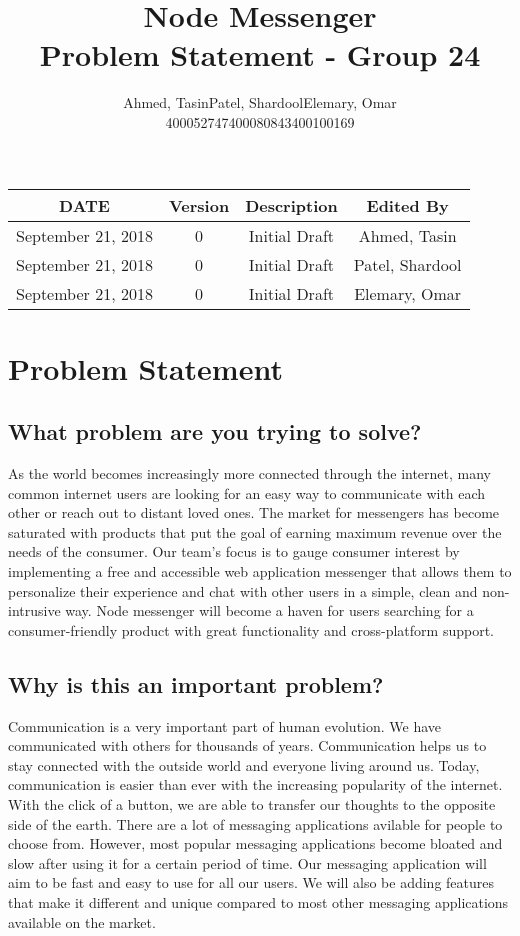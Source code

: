 \documentclass{article}
\title{\Huge\textbf{Node Messenger}\\
		\huge{Problem Statement - Group 24}}
\author{Ahmed, Tasin\hspace{1cm}Patel, Shardool\hspace{1cm}Elemary, Omar \\
		400052747\hspace{2cm}400080843\hspace{2cm}400100169}
\begin{document}
\maketitle
  	
\begin{table}[hp]
\begin{center}
\label{tab:}
\begin{tabular}{|c|c|c|c|}
\hline
\textbf{DATE} & \textbf{Version} & \textbf{Description} & \textbf{Edited By}\\
\hline
September 21, 2018 & 0 & Initial Draft & Ahmed, Tasin\\
\hline
September 21, 2018 & 0 & Initial Draft & Patel, Shardool\\
\hline
September 21, 2018 & 0 & Initial Draft & Elemary, Omar\\
\hline
\end{tabular}
\end{center}
\label{default}
\end{table}
	\newpage
	\newpage
	\section{Problem Statement}
	\subsection{What problem are you trying to solve?}
    As the world becomes increasingly more connected through the internet, many common internet users are looking for an easy way to communicate with each other or reach out to distant loved ones. The market for messengers has become saturated with products that put the goal of earning maximum revenue over the needs of the consumer. Our team’s focus is to gauge consumer interest by implementing a free and accessible web application messenger that allows them to personalize their experience and chat with other users in a simple, clean and non-intrusive way. Node messenger will become a haven for users searching for a consumer-friendly product with great functionality and cross-platform support.
	\subsection{Why is this an important problem?}
    Communication is a very important part of human evolution. We have communicated with others for thousands of years. Communication helps us to stay connected with the outside world and everyone living around us. Today, communication is easier than ever with the increasing popularity of the internet. With the click of a button, we are able to transfer our thoughts to the opposite side of the earth. There are a lot of messaging applications avilable for people to choose from. However, most popular messaging applications become bloated and slow after using it for a certain period of time. Our messaging application will aim to be fast and easy to use for all our users. We will also be adding features that make it different and unique compared to most other messaging applications available on the market.  
\end{document}
